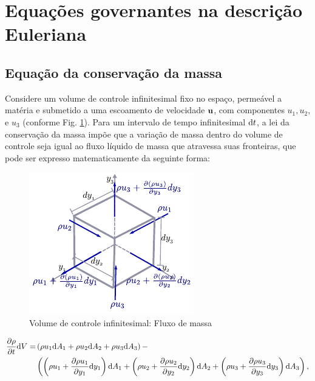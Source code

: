 \documentclass[tese_patricia]{subfiles}%
\begin{document}
\section{Equações governantes na descrição Euleriana} 


\subsection{Equação da conservação da massa}


Considere um volume de controle infinitesimal fixo no espaço, permeável a matéria e submetido a uma escoamento de velocidade $\mathbf{u}$, com componentes $u_1, u_2$, e $u_3$ (conforme Fig. \ref{fig:volInf_fluxoMassa}). Para um intervalo de tempo infinitesimal $\mathrm{d} t$, a lei da conservação da massa impõe que a variação de massa dentro do volume de controle seja igual ao fluxo líquido de massa que atravessa suas fronteiras, que pode ser expresso matematicamente da seguinte forma:

\begin{figure}[htb!]
	\centering 
	\includegraphics[scale=1.5,trim=0cm 0.0cm 0cm 0.0cm, clip=true]{Imagens/Cap2/volInf_fluxoMassa.pdf}	
	\caption{Volume de controle infinitesimal: Fluxo de massa}
	\label{fig:volInf_fluxoMassa}
\end{figure}


\begin{align}
	\begin{split}
	\frac{\partial \rho}{\partial t}\mathrm{d} V =& \left(\rho u_1 \mathrm{d} A_{1}  +  \rho u_2 \mathrm{d} A_{2} + \rho u_3  \mathrm{d} A_{3} \right) - \\  &\left(\left(\rho u_1 + \frac{\partial \rho u_1}{\partial y_1}\mathrm{d} y_1 \right)\mathrm{d} A_{1} + \left(\rho u_2+ \frac{\partial \rho u_2}{\partial y_2}\mathrm{d} y_2 \right) \mathrm{d} A_{2} + \left(\rho u_3 + \frac{\partial \rho u_3}{\partial y_3}\mathrm{d} y_3 \right) \mathrm{d} A_{3}\right), \label{eq:conser_massa_0} 
	\end{split}
\end{align}
\end{document}
